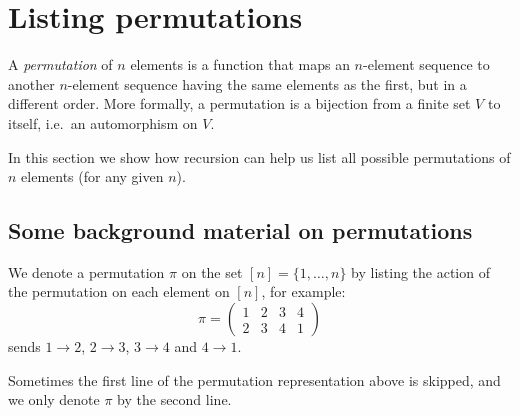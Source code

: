 \documentclass[a4paper]{book}
\theoremstyle{changebreak}                %
\begin{document}
\section{Listing permutations}
\label{s:recursion:permutation}
A {\it permutation} of $n$ elements is a function
that maps an $n$-element sequence to another
$n$-element sequence having the same elements as the first, but in a
different order. More formally, a permutation is a
bijection from a finite set $V$ to itself, i.e.~an
automorphism on $V$.

In this section we show how recursion can help us list all possible
permutations of $n$ elements (for any given $n$).

\subsection{Some background material on permutations}
\label{s:recursion:permutation:notation}
We denote a permutation $\pi$ on the set
$[n]=\{1,\ldots,n\}$\index{$[n]$} by listing the
action of the permutation on
each element on $[n]$, for example:
\begin{equation*}
  \pi=\left(
  \begin{array}{cccc} 1 & 2 & 3 & 4 \\ 2 & 3 & 4 & 1 \end{array}
      \right)
\end{equation*}
sends $1\to 2$, $2\to 3$, $3\to 4$ and $4\to 1$. 

Sometimes the first line of the permutation representation above is
skipped, and we only denote $\pi$ by the second line.
\end{document}
